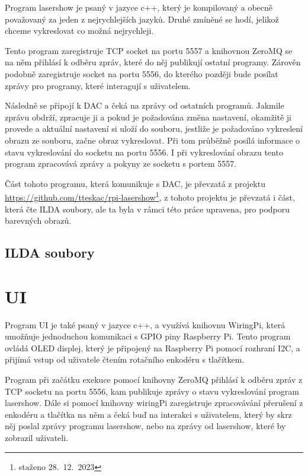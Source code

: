 \documentclass{template/socthesis}
\begin{document}
Program lasershow je psaný v jazyce c++, který je kompilovaný a obecně považovaný za jeden z nejrychlejších jazyků. Druhé zmíněné se hodí, jelikož chceme vykreslovat co možná nejrychleji.


Tento program zaregistruje TCP socket na portu 5557 a knihovnou ZeroMQ se na něm přihlásí k odběru zpráv, které do něj publikují ostatní programy. Zárověn podobně zaregistruje socket na portu 5556, do kterého později bude posílat zprávy pro programy, které interagují s uživatelem.

Následně se připojí k DAC a čeká na zprávy od ostatních programů. Jakmile zprávu obdrží, zpracuje ji a pokud je požadována změna nastavení, okamžitě ji provede a aktuální nastavení si uloží do souboru, jestliže je požadováno vykreslení obrazu ze souboru, začne obraz vykreslovat. Při tom průběžně posílá informace o stavu vykreslování do socketu na portu 5556. I při vykreslování obrazu tento program zpracovává zprávy a pokyny ze socketu s portem 5557.

Část tohoto programu, která komunikuje s DAC, je převzatá z projektu \url{https://github.com/tteskac/rpi-lasershow}\footnote{staženo 28.~12.~2023}, z tohoto projektu je převzatá i část, která čte ILDA soubory, ale ta byla v rámci této práce upravena, pro podporu barevných obrazů.

\subsection{ILDA soubory}

\section{UI}

Program UI je také psaný v jazyce c++, a využívá knihovnu WiringPi, která umožňuje jednoduchou komunikaci s GPIO piny Raspberry Pi. Tento program ovládá OLED displej, který je připojený na Raspberry Pi pomocí rozhraní I2C, a přijímá vstup od uživatele čtením rotačního enkodéru s tlačítkem.

Program při začátku exekuce pomocí knihovny ZeroMQ přihlásí k odběru zpráv z TCP socketu na portu 5556, kam publikuje zprávy o stavu vykreslování program lasershow. Dále si pomocí knihovny wiringPi zaregistruje zpracovávání přerušení z enkodéru a tlačítka na něm a čeká buď na interakci s uživatelem, který by skrz něj poslal zprávy programu lasershow, nebo na zprávy od lasershow, které by zobrazil uživateli.
\end{document}
